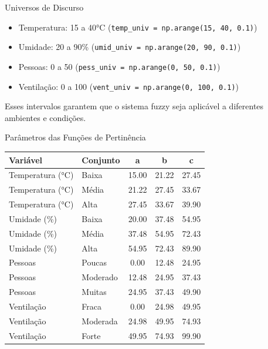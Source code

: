 \documentclass[aspectratio=169]{beamer}
\begin{document}
\begin{frame}{Universos de Discurso}
    \begin{itemize}
        \item Temperatura: 15 a 40°C \hspace{1em} (\texttt{temp\_univ = np.arange(15, 40, 0.1)})
        \item Umidade: 20 a 90\% \hspace{1em} (\texttt{umid\_univ = np.arange(20, 90, 0.1)})
        \item Pessoas: 0 a 50 \hspace{1em} (\texttt{pess\_univ = np.arange(0, 50, 0.1)})
        \item Ventilação: 0 a 100 \hspace{1em} (\texttt{vent\_univ = np.arange(0, 100, 0.1)})
    \end{itemize}
    \vspace{0.5em}
    {\small Esses intervalos garantem que o sistema fuzzy seja aplicável a diferentes ambientes e condições.}
\end{frame}

\begin{frame}{Parâmetros das Funções de Pertinência}
    \centering
    \scriptsize
    \begin{tabular}{llccc}
    \toprule
    \textbf{Variável} & \textbf{Conjunto} & \textbf{a} & \textbf{b} & \textbf{c} \\
    \midrule
    Temperatura (°C) & Baixa   & 15.00 & 21.22 & 27.45 \\
    Temperatura (°C) & Média   & 21.22 & 27.45 & 33.67 \\
    Temperatura (°C) & Alta    & 27.45 & 33.67 & 39.90 \\
    Umidade (\%)     & Baixa   & 20.00 & 37.48 & 54.95 \\
    Umidade (\%)     & Média   & 37.48 & 54.95 & 72.43 \\
    Umidade (\%)     & Alta    & 54.95 & 72.43 & 89.90 \\
    Pessoas          & Poucas  & 0.00  & 12.48 & 24.95 \\
    Pessoas          & Moderado& 12.48 & 24.95 & 37.43 \\
    Pessoas          & Muitas  & 24.95 & 37.43 & 49.90 \\
    Ventilação       & Fraca   & 0.00  & 24.98 & 49.95 \\
    Ventilação       & Moderada& 24.98 & 49.95 & 74.93 \\
    Ventilação       & Forte   & 49.95 & 74.93 & 99.90 \\
    \bottomrule
    \end{tabular}
    \vspace{0.5em}

\end{frame}
\end{document}

